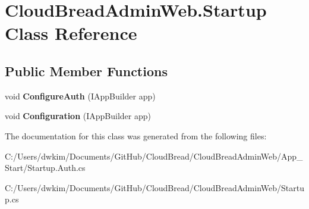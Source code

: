 \hypertarget{class_cloud_bread_admin_web_1_1_startup}{}\section{Cloud\+Bread\+Admin\+Web.\+Startup Class Reference}
\label{class_cloud_bread_admin_web_1_1_startup}
\subsection*{Public Member Functions}
\begin{DoxyCompactItemize}
\item 
void {\bfseries Configure\+Auth} (I\+App\+Builder app)\hypertarget{class_cloud_bread_admin_web_1_1_startup_a0f98aec83695a6a56de65a11ed85faeb}{}\label{class_cloud_bread_admin_web_1_1_startup_a0f98aec83695a6a56de65a11ed85faeb}

\item 
void {\bfseries Configuration} (I\+App\+Builder app)\hypertarget{class_cloud_bread_admin_web_1_1_startup_a33199b2950e6de586c0d56f125eefe62}{}\label{class_cloud_bread_admin_web_1_1_startup_a33199b2950e6de586c0d56f125eefe62}

\end{DoxyCompactItemize}


The documentation for this class was generated from the following files\+:\begin{DoxyCompactItemize}
\item 
C\+:/\+Users/dwkim/\+Documents/\+Git\+Hub/\+Cloud\+Bread/\+Cloud\+Bread\+Admin\+Web/\+App\+\_\+\+Start/Startup.\+Auth.\+cs\item 
C\+:/\+Users/dwkim/\+Documents/\+Git\+Hub/\+Cloud\+Bread/\+Cloud\+Bread\+Admin\+Web/Startup.\+cs\end{DoxyCompactItemize}
